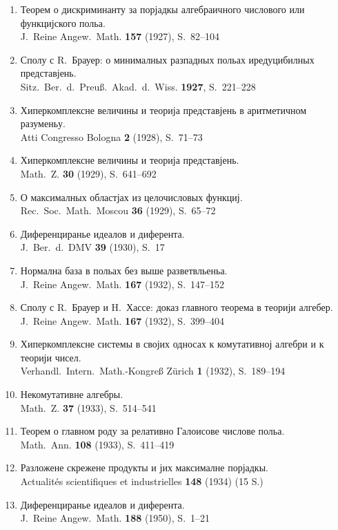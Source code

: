 \documentclass[11pt]{article}
\newcommand{\foreign}[1]{#1}
\begin{document}
\begin{enumerate}[label={\small\arabic*.},leftmargin=2em,itemsep=0.3em]
\item Теорем о дискриминанту за порјадкы алгебраичного числового или функцијского польа.\\
\foreign{J.\ Reine Angew.\ Math.} \textbf{157} (1927), S.~82--104

\item Сполу с R.\ Брауер: о минималных разпадных польах иредуцибилных представјень.\\
\foreign{Sitz.\ Ber.\ d.\ Preuß.\ Akad.\ d.\ Wiss.} \textbf{1927}, S.~221--228

\item Хиперкомплексне величины и теорија представјень в аритметичном разуменьу.\\
\foreign{Atti Congresso Bologna} \textbf{2} (1928), S.~71--73

\item Хиперкомплексне величины и теорија представјень.\\
\foreign{Math.\ Z.} \textbf{30} (1929), S.~641--692

\item О максималных областјах из целочисловых функциј.\\
\foreign{Rec.\ Soc.\ Math.\ Moscou} \textbf{36} (1929), S.~65--72

\item Диференциранье идеалов и диферента.\\
\foreign{J.\ Ber.\ d.\ DMV} \textbf{39} (1930), S.~17

\item Нормална база в польах без выше разветвльеньа.\\
\foreign{J.\ Reine Angew.\ Math.} \textbf{167} (1932), S.~147--152

\item Сполу с R.\ Брауер и H.\ Хассе: доказ главного теорема в теорији алгебер.\\
\foreign{J.\ Reine Angew.\ Math.} \textbf{167} (1932), S.~399--404

\item Хиперкомплексне системы в својих односах к комутативној алгебри и к теорији чисел.\\
\foreign{Verhandl.\ Intern.\ Math.-Kongreß Zürich} \textbf{1} (1932), S.~189--194

\item Некомутативне алгебры.\\
\foreign{Math.\ Z.} \textbf{37} (1933), S.~514--541

\item Теорем о главном роду за релативно Галоисове числове польа.\\
\foreign{Math.\ Ann.} \textbf{108} (1933), S.~411--419

\item Разложене скрежене продукты и јих максималне порјадкы.\\
\foreign{Actualités scientifiques et industrielles} \textbf{148} (1934) (15 S.)

\item Диференциранье идеалов и диферента.\\
\foreign{J.\ Reine Angew.\ Math.} \textbf{188} (1950), S.~1--21
\end{enumerate}
\end{document}
